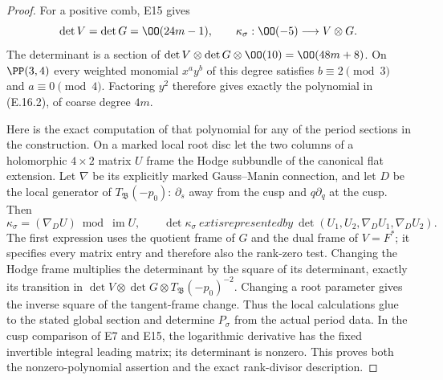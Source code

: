 \begin{proof}
For a positive comb, E15 gives
\[
 \det V=\det G=\OO(24m-1),\qquad
 \kappa_\sigma:\OO(-5)\longrightarrow V\otimes G.
\]
The determinant is a section of $\det V\otimes\det G\otimes\OO(10)=\OO(48m+8)$. On $\PP(3,4)$ every weighted monomial $x^ay^b$ of this degree satisfies $b\equiv2\pmod3$ and $a\equiv0\pmod4$. Factoring $y^2$ therefore gives exactly the polynomial in (E.16.2), of coarse degree $4m$.

Here is the exact computation of that polynomial for any of the period sections in the construction. On a marked local root disc let the two columns of a holomorphic $4\times2$ matrix $U$ frame the Hodge subbundle of the canonical flat extension. Let $\nabla$ be its explicitly marked Gauss--Manin connection, and let $D$ be the local generator of $T_{\mathfrak B}(-p_0)$: $\partial_s$ away from the cusp and $q\partial_q$ at the cusp. Then
\[
 \kappa_\sigma=(\nabla_DU)\bmod\operatorname{im}U,
 \qquad
 \det\kappa_\sigma\ 	ext{is represented by}\
 \det(U_1,U_2,\nabla_DU_1,\nabla_DU_2).              \tag{E.16.3}
\]
The first expression uses the quotient frame of $G$ and the dual frame of $V=F^*$; it specifies every matrix entry and therefore also the rank-zero test. Changing the Hodge frame multiplies the determinant by the square of its determinant, exactly its transition in $\det V\otimes\det G\otimes T_{\mathfrak B}(-p_0)^{-2}$. Changing a root parameter gives the inverse square of the tangent-frame change. Thus the local calculations glue to the stated global section and determine $P_\sigma$ from the actual period data. In the cusp comparison of E7 and E15, the logarithmic derivative has the fixed invertible integral leading matrix; its determinant is nonzero. This proves both the nonzero-polynomial assertion and the exact rank-divisor description.
\end{proof}



